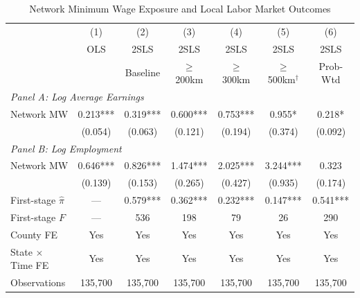 \documentclass[12pt]{article}
\begin{document}
\begin{table}[t]
\centering
\caption{Network Minimum Wage Exposure and Local Labor Market Outcomes}
\label{tab:main}
\begin{threeparttable}
\begin{tabular}{l cccccc}
\toprule
 & (1) & (2) & (3) & (4) & (5) & (6) \\
 & OLS & 2SLS & 2SLS & 2SLS & 2SLS & 2SLS \\
 & & Baseline & $\geq$200km & $\geq$300km & $\geq$500km$^{\dagger}$ & Prob-Wtd \\
\midrule
\multicolumn{7}{l}{\textit{Panel A: Log Average Earnings}} \\[3pt]
Network MW & 0.213*** & 0.319*** & 0.600*** & 0.753*** & 0.955* & 0.218* \\
 & (0.054) & (0.063) & (0.121) & (0.194) & (0.374) & (0.092) \\[6pt]
\multicolumn{7}{l}{\textit{Panel B: Log Employment}} \\[3pt]
Network MW & 0.646*** & 0.826*** & 1.474*** & 2.025*** & 3.244*** & 0.323 \\
 & (0.139) & (0.153) & (0.265) & (0.427) & (0.935) & (0.174) \\
\midrule
First-stage $\hat{\pi}$ & --- & 0.579*** & 0.362*** & 0.232*** & 0.147*** & 0.541*** \\
First-stage $F$ & --- & 536 & 198 & 79 & 26 & 290 \\
County FE & Yes & Yes & Yes & Yes & Yes & Yes \\
State $\times$ Time FE & Yes & Yes & Yes & Yes & Yes & Yes \\
Observations & 135,700 & 135,700 & 135,700 & 135,700 & 135,700 & 135,700 \\
\bottomrule
\end{tabular}
\begin{tablenotes}[flushleft]
\small

\end{tablenotes}
\end{threeparttable}
\end{table}
\end{document}
